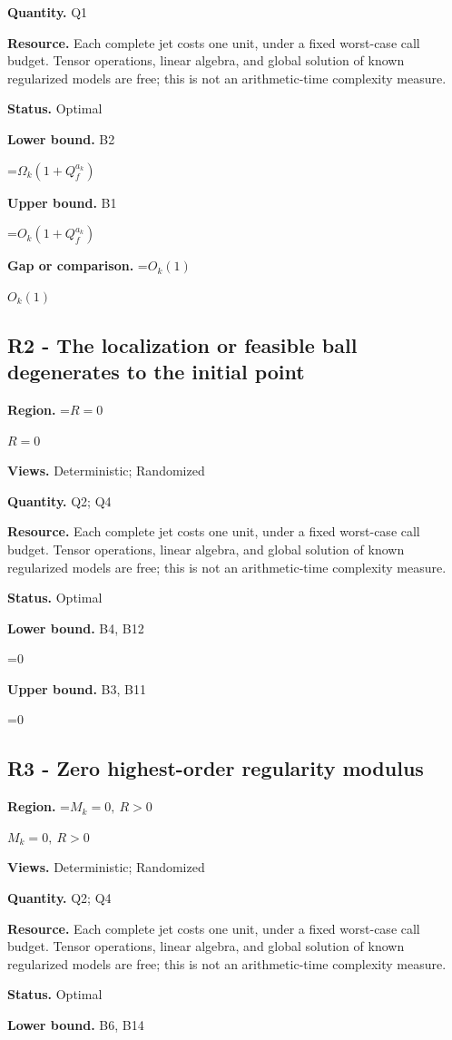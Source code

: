 \documentclass[10pt,a4paper]{article}
\newcommand{\AtlasMath}[1]{\par\begingroup\centering\setbox0=\hbox{$\displaystyle #1$}\ifdim\wd0>1.4\linewidth\typeout{ATLAS WIDE FORMULA: \the\wd0}\fi\ifdim\wd0>\linewidth\resizebox{\linewidth}{!}{\box0}\else\box0\fi\par\endgroup}
\newcommand{\AtlasInlineMath}[1]{\begingroup\setbox0=\hbox{$#1$}\ifdim\wd0>.4\linewidth\endgroup\AtlasMath{#1}\else\endgroup$#1$\fi}
\begin{document}
\textbf{Quantity.} Q1

\textbf{Resource.} Each complete jet costs one unit, under a fixed worst-case call budget. Tensor operations, linear algebra, and global solution of known regularized models are free; this is not an arithmetic-time complexity measure.

\textbf{Status.} Optimal

\textbf{Lower bound.} B2

\AtlasMath{\Omega_k(1+Q_f^{a_k})}
\textbf{Upper bound.} B1

\AtlasMath{O_k(1+Q_f^{a_k})}
\textbf{Gap or comparison.} \AtlasInlineMath{O_k(1)}

\subsection{R2 - The localization or feasible ball degenerates to the initial point}
\textbf{Region.} \AtlasInlineMath{R=0}

\textbf{Views.} Deterministic; Randomized

\textbf{Quantity.} Q2; Q4

\textbf{Resource.} Each complete jet costs one unit, under a fixed worst-case call budget. Tensor operations, linear algebra, and global solution of known regularized models are free; this is not an arithmetic-time complexity measure.

\textbf{Status.} Optimal

\textbf{Lower bound.} B4, B12

\AtlasMath{0}
\textbf{Upper bound.} B3, B11

\AtlasMath{0}
\subsection{R3 - Zero highest-order regularity modulus}
\textbf{Region.} \AtlasInlineMath{M_k=0,\ R>0}

\textbf{Views.} Deterministic; Randomized

\textbf{Quantity.} Q2; Q4

\textbf{Resource.} Each complete jet costs one unit, under a fixed worst-case call budget. Tensor operations, linear algebra, and global solution of known regularized models are free; this is not an arithmetic-time complexity measure.

\textbf{Status.} Optimal

\textbf{Lower bound.} B6, B14
\end{document}
